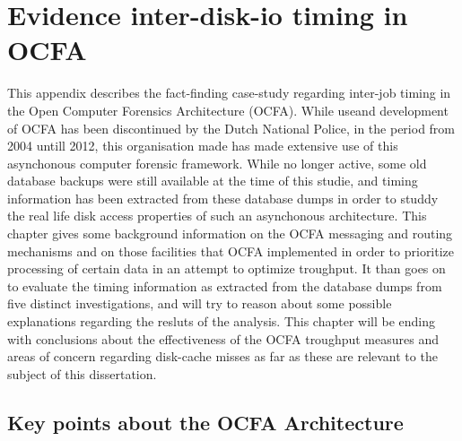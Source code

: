\chapter{Evidence inter-disk-io timing in OCFA}
This appendix describes the fact-finding case-study regarding inter-job timing in the Open Computer Forensics Architecture (OCFA). While useand development of OCFA has been discontinued by the Dutch National Police, in the period from 2004 untill 2012, this organisation made has made extensive use of this asynchonous computer forensic framework. While no longer active, some old database backups were still available at the time of this studie, and timing information has been extracted from these database dumps in order to studdy the real life disk access properties of such an asynchonous architecture. This chapter gives some background information on the OCFA messaging and routing mechanisms and on those facilities that OCFA implemented in order to prioritize processing of certain data in an attempt to optimize troughput. It than goes on to evaluate the timing information as extracted from the database dumps from five distinct investigations, and will try to reason about some possible explanations regarding the resluts of the analysis. This chapter will be ending with conclusions about the effectiveness of the OCFA troughput measures and areas of concern regarding disk-cache misses as far as these are relevant to the subject of this dissertation.
\section{Key points about the OCFA Architecture}

